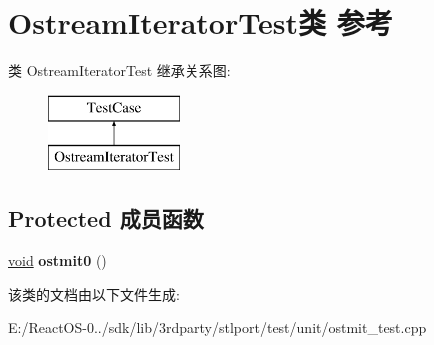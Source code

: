 \hypertarget{class_ostream_iterator_test}{}\section{Ostream\+Iterator\+Test类 参考}
\label{class_ostream_iterator_test}
类 Ostream\+Iterator\+Test 继承关系图\+:\begin{figure}[H]
\begin{center}
\leavevmode
\includegraphics[height=2.000000cm]{class_ostream_iterator_test}
\end{center}
\end{figure}
\subsection*{Protected 成员函数}
\begin{DoxyCompactItemize}
\item 
\mbox{\label{class_ostream_iterator_test_a8a541c722d75f26066ca222462aa2529}} 
\hyperlink{interfacevoid}{void} {\bfseries ostmit0} ()
\end{DoxyCompactItemize}


该类的文档由以下文件生成\+:\begin{DoxyCompactItemize}
\item 
E\+:/\+React\+O\+S-\/0../sdk/lib/3rdparty/stlport/test/unit/ostmit\+\_\+test.\+cpp\end{DoxyCompactItemize}
